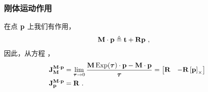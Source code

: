\subsubsection{刚体运动作用}
\label{sec:jac_SE3_action}
%
在点 ${\bf p}$ 上我们有作用，
%
\begin{align}
{\bf M}\cdot{\bf p} &\triangleq {\bf t}+{\bf R}{\bf p}
~,
\end{align}
%
因此，从方程  ，
%
\begin{align}
{{\bf J}^{{\bf M}\cdot{\bf p}}_{{\bf M}}} 
  &= 
  \lim_{{\bm \tau}\to0}\frac{{\bf M}\operatorname*{Exp}({\bm \tau})\cdot{\bf p} - {\bf M}\cdot{\bf p}}{{\bm \tau}}
  = \begin{bmatrix}{\bf R} & -{\bf R}\left[{\bf p}\right]_\times \end{bmatrix} \\
{{\bf J}^{{\bf M}\cdot{\bf p}}_{{\bf p}}} &= {\bf R}
~.
\end{align}
